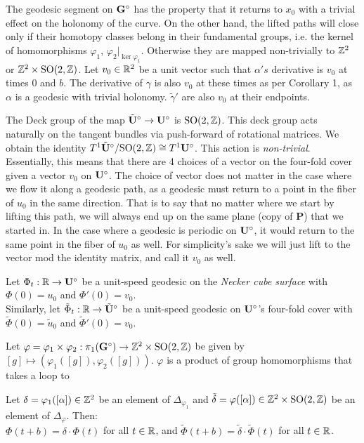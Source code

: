 \documentclass[]{article}
\def\btUs{\btU^\circ}
\def\utild{\tilde{u}_0}
\def\gamtild{\tilde{\gamma}}
\def\phitild{\tilde{\Phi}}
\def\SO{\mathrm{SO}}
\begin{document}
The geodesic segment on $\mathbf{G}^\circ$ has the property that it returns to $x_0$ with a trivial effect on the holonomy of the curve. On the other hand, the lifted paths will close only if their homotopy classes belong in their fundamental groups, i.e. the kernel of homomorphisms $\varphi_1$, $\varphi_2|_{\ker\varphi_1}$. Otherwise they are mapped non-trivially to $\mathbb{Z}^2$ or $\ZZ^2\times\SO(2,\ZZ)$. Let $v_0\in\mathbb{R}^2$ be a unit vector such that $\alpha's$ derivative is $v_0$ at times $0$ and $b$. The derivative of $\gamma$ is also $v_0$ at these times as per Corollary 1, as $\alpha$ is a geodesic with trivial holonomy. $\gamtild'$ are also $v_0$ at their endpoints.

The Deck group of the map $\btUs\rightarrow\bUs$ is $\SO(2,\ZZ)$. This deck group acts naturally on the tangent bundles via push-forward of rotational matrices. We obtain the identity $T^1\btUs/\SO(2,\ZZ)\cong T^1\bUs$. This action is \emph{non-trivial}. Essentially, this means that there are 4 choices of a vector on the four-fold cover given a vector $v_0$ on $\mathbf{U}^\circ$. The choice of vector does not matter in the case where we flow it along a geodesic path, as a geodesic must return to a point in the fiber of $u_0$ in the same direction. That is to say that no matter where we start by lifting this path, we will always end up on the same plane (copy of $\mathbf{P}$) that we started in. In the case where a geodesic is periodic on $\mathbf{U}^\circ$, it would return to the same point in the fiber of $u_0$ as well. For simplicity's sake we will just lift to the vector mod the identity matrix, and call it $v_0$ as well.

\begin{Def}
Let $\Phi_t:\mathbb{R}\rightarrow\mathbf{U}^\circ$ be a unit-speed geodesic on the \emph{Necker cube surface} with $\Phi(0)=u_0$ and $\Phi'(0)=v_0$. \\Similarly, let $\tilde{\Phi}_t:\RR\rightarrow\btUs$ be a unit-speed geodesic on $\mathbf{U}^\circ$'s four-fold cover with $\phitild(0)=\utild$ and $\phitild'(0)=v_0$.
\end{Def}
Let $\varphi=\varphi_1\times\varphi_2:\pi_1(\bGs)\rightarrow \ZZ^2\times\SO(2,\ZZ)$ be given by $[g]\mapsto(\varphi_1([g]),\varphi_2([g]))$. $\varphi$ is a
product of group homomorphisms that takes a loop to 
\begin{thm}
Let $\delta=\varphi_1([\alpha])\in\mathbb{Z}^2$ be an element of $\Delta_{\varphi_1}$ and $\tilde{\delta}=\varphi([\alpha])\in\ZZ^2\times \SO(2,\ZZ)$ be an element of $\Delta_{\varphi}$. Then:\\
$\Phi(t+b)=\delta\cdot\Phi(t)$ for all $t\in\mathbb{R}$, and 
$\phitild(t+b)=\tilde{\delta}\cdot\phitild(t)$ for all $t\in\mathbb{R}$.
\end{thm}
\end{document}
